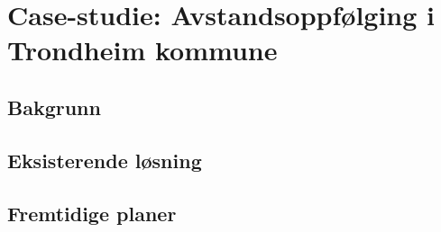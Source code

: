 \chapter{Case-studie: Avstandsoppfølging i Trondheim kommune}
\label{ch:case}

\section{Bakgrunn}

\section{Eksisterende løsning}

\section{Fremtidige planer}
